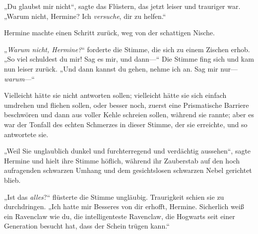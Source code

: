 „Du glaubst mir nicht“, sagte das Flüstern, das jetzt leiser und trauriger war. „Warum nicht, Hermine? Ich \emph{versuche}, dir zu helfen.“

Hermine machte einen Schritt zurück, weg von der schattigen Nische.

„\emph{Warum nicht, Hermine?}“ forderte die Stimme, die sich zu einem Zischen erhob. „So viel schuldest du mir! Sag es mir, und dann—“ Die Stimme fing sich und kam nun leiser zurück. „Und dann kannst du gehen, nehme ich an. Sag mir nur—\emph{warum}—“

Vielleicht hätte sie nicht antworten sollen; vielleicht hätte sie sich einfach umdrehen und fliehen sollen, oder besser noch, zuerst eine Prismatische Barriere beschwören und dann aus voller Kehle schreien sollen, während sie rannte; aber es war der Tonfall des echten Schmerzes in dieser Stimme, der sie erreichte, und so antwortete sie.

„Weil Sie unglaublich dunkel und furchterregend und verdächtig aussehen“, sagte Hermine und hielt ihre Stimme höflich, während ihr Zauberstab auf den hoch aufragenden schwarzen Umhang und dem gesichtslosen schwarzen Nebel gerichtet blieb.

„Ist das \emph{alles}?“ flüsterte die Stimme ungläubig. Traurigkeit schien sie zu durchdringen. „Ich hatte mir Besseres von dir erhofft, Hermine. Sicherlich weiß ein Ravenclaw wie du, die intelligenteste Ravenclaw, die Hogwarts seit einer Generation besucht hat, dass der Schein trügen kann.“

